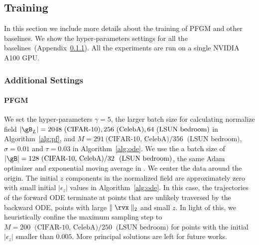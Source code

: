 \subsection{Training}
\label{app:training}

In this section we include more details about the training of PFGM and other baselines. We show the hyper-parameters settings for all the baselines~(Appendix~\ref{app:hyper-train}). All the experiments are run on a single NVIDIA A100 GPU.


\subsubsection{Additional Settings}
\label{app:hyper-train}

\paragraph{PFGM} We set the hyper-parameters $\gamma=5$, the larger batch size for calculating normalize field $|\gB_L|=2048~\textrm{(CIFAR-10)}, 256~\textrm{(CelebA)}, 64~\textrm{(LSUN bedroom)}$ in Algorithm~\ref{alg:pf}, and $M=291~\textrm{(CIFAR-10, CelebA)}/356~\textrm{ (LSUN bedroom)}$, $\sigma=0.01$ and $\tau=0.03$ in Algorithm~\ref{alg:ode}. We use the a batch size of $|\gB|=128~\textrm{(CIFAR-10, CelebA)}/32~\textrm{ (LSUN bedroom)}$, the same Adam optimizer and exponential moving average in \cite{Song2021ScoreBasedGM}. We center the data around the origin. The initial $z$ components in the normalized field are approximately zero with small initial $|\epsilon_z|$ values in Algorithm~\ref{alg:ode}. In this case, the trajectories of the forward ODE terminate at points that are unlikely traversed by the backward ODE, \ie points with large $\parallel \rvx\parallel_2$ and small $z$. In light of this, we heuristically confine the maximum sampling step to $M=200~\textrm{ (CIFAR-10, CelebA)}/250~\textrm{ (LSUN bedroom)}$ for points with the initial $|\epsilon_z|$ smaller than $0.005$. More principal solutions are left for future works.

